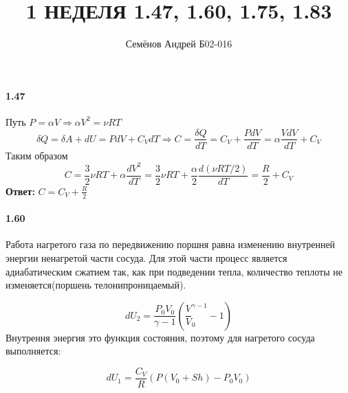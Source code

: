\documentclass{article}
\title{1 НЕДЕЛЯ 1.47, 1.60, 1.75, 1.83}
\author{Семёнов Андрей Б02-016}
\begin{document}
\maketitle

\paragraph{1.47}
\par Путь $P=\alpha V\Rightarrow\alpha V^2=\nu RT$
\begin{displaymath}
\delta Q=\delta A+dU=PdV + C_{V}dT\Rightarrow C=\frac{\delta Q}{dT}=C_{V}+\frac{PdV}{dT}=\alpha\frac{VdV}{dT}+C_{V}
\end{displaymath}
Таким образом
\begin{displaymath}
C=\frac32\nu RT + \alpha\frac{dV^2}{dT}=\frac32\nu RT + \frac\alpha2\frac{d(\nu RT/2)}{dT}=\frac R2 +C_{V}
\end{displaymath}
\textbf{Ответ:} $C=C_{V}+\frac R2$


\paragraph{1.60}
\par Работа нагретого газа по передвижению поршня равна изменению внутренней энергии ненагретой части сосуда. Для этой части процесс является адиабатическим сжатием так, как при подведении тепла, количество теплоты не изменяется(поршень телонипроницаемый).
\begin{figure}[h]
\begin{minipage}[h]{0.49\linewidth}
\end{minipage}
\end{figure}
\begin{displaymath}
dU_{2}=\frac{P_{0}V_{0}}{\gamma -1}(\frac VV_{0}^{\gamma -1}-1)
\end{displaymath}
Внутрення энергия это функция состояния, поэтому для нагретого сосуда выполняется:

\begin{displaymath}
dU_{1}=\frac{C_{V}}{R}(P(V_{0}+Sh)-P_{0}V_{0})
\end{displaymath}
\end{document}
